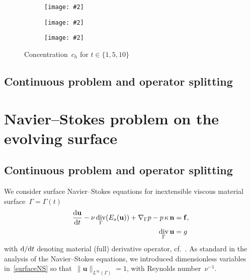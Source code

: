 \documentclass[12pt]{article}
\newcommand{\includegraphicsw}[2][1.]{\texttt{[image: \#2]}}
\newcommand{\vect}[1]{\boldsymbol{\mathbf{#1}}}
\DeclareMathOperator{\Div}{div}
\newcommand{\LInfSpace}[1][\Gamma]{{L^\infty\left({#1}\right)}}
\begin{document}
\begin{figure}[H]
	\centering
	\begin{subfigure}{.33\linewidth}
		\includegraphicsw[.9]{{ch6_0.3_t=1.cropped}.png}
	\end{subfigure}%
	\begin{subfigure}{.33\linewidth}
		\includegraphicsw[.9]{{ch6_0.3_t=5.cropped}.png}
	\end{subfigure}%
	\begin{subfigure}{.33\linewidth}
		\includegraphicsw[.9]{{ch6_0.3_t=10.cropped}.png}
	\end{subfigure}%
	\caption{Concentration~$c_h$ for $t \in \{ 1, 5, 10 \}$}
	\label{fig:ch:soln}		
\end{figure}

\clearpage

\subsection{Continuous problem and operator splitting}

\section{Navier--Stokes problem on the evolving surface}

\subsection{Continuous problem and operator splitting}

We consider surface Navier--Stokes equations for inextensible viscous material surface~$\Gamma = \Gamma(t)$
\begin{align}\begin{split}\label{surfaceNS}
	\frac{\mbox d\vect u}{\mbox d t} - \nu\Div_\Gamma(E_s(\vect u)) + \nabla_\Gamma p - p\,\kappa\,\vect n &= \vect f,\\
	\Div_\Gamma \vect u &= g
\end{split}\end{align}
with $\mbox d / \mbox d t$ denoting material (full) derivative operator, cf.~\cite[p.~8]{Jankuhn_2018}. As standard in the analysis of the Navier--Stokes equations, we introduced dimensionless variables in~\eqref{surfaceNS} so that~$\|\vect u\|_{\LInfSpace} = 1$, with Reynolds number~$\nu^{-1}$. 
\end{document}
